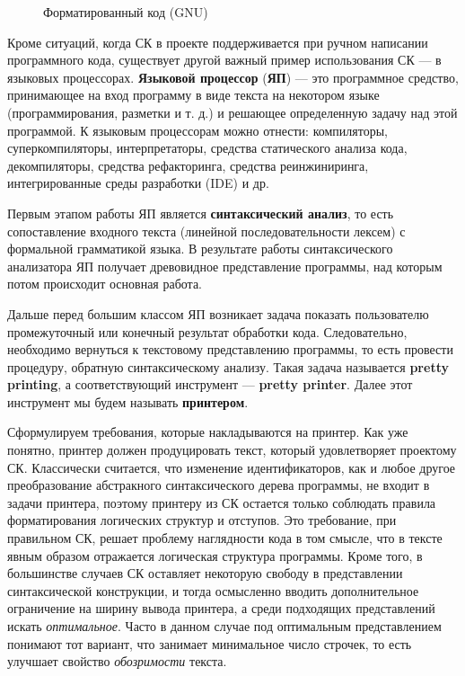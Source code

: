 \begin{figure}[h!]
	\centering
	
  \caption{Форматированный код (GNU)}
	\label{fig:wikiExGNU}
\end{figure}

Кроме ситуаций, когда СК в проекте поддерживается при ручном написании
программного кода, существует другой важный пример использования СК ---
в языковых процессорах. \textbf{Языковой процессор} (\textbf{ЯП}) ---
это программное средство, принимающее на вход программу в виде текста
на некотором языке (программирования, разметки и т. д.) и решающее
определенную задачу над этой программой. К языковым процессорам можно
отнести: компиляторы, суперкомпиляторы, интерпретаторы,
средства статического анализа кода, декомпиляторы, средства рефакторинга,
средства реинжиниринга, интегрированные среды разработки (IDE) и др.

Первым этапом работы ЯП является \textbf{синтаксический анализ}, то есть
сопоставление входного текста (линейной последовательности лексем) с формальной
грамматикой языка. В результате работы синтаксического анализатора ЯП получает
древовидное представление программы, над которым потом происходит основная работа.

Дальше перед большим классом ЯП возникает задача показать пользователю
промежуточный или конечный результат обработки кода.
Следовательно, необходимо вернуться к текстовому представлению программы,
то есть провести процедуру, обратную синтаксическому анализу. Такая задача
называется \textbf{pretty printing}, а соответствующий инструмент ---
\textbf{pretty printer}. Далее этот инструмент мы будем называть
\textbf{принтером}.

Сформулируем требования, которые накладываются на принтер.
Как уже понятно, принтер должен
продуцировать текст, который удовлетворяет проектому СК.
Классически считается, что изменение идентификаторов, как и любое другое
преобразование абстракного синтаксического дерева программы, не входит в
задачи принтера, поэтому принтеру из СК остается только соблюдать правила
форматирования логических структур и отступов.
Это требование, при правильном СК, решает проблему наглядности кода в том смысле,
что в тексте явным образом отражается логическая структура программы.
Кроме того, в большинстве случаев СК оставляет некоторую свободу в представлении
синтаксической конструкции, и тогда осмысленно вводить дополнительное
ограничение на ширину вывода принтера, а среди подходящих представлений
искать \textit{оптимальное}. Часто в данном случае под
оптимальным представлением понимают тот вариант,
что занимает минимальное число строчек,
то есть улучшает свойство \textit{обозримости} текста.

